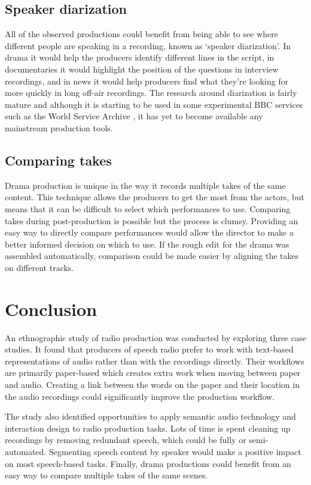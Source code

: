 \subsection{Speaker diarization}
All of the observed productions could benefit from being able to see where different people are speaking in a
recording, known as `speaker diarization'. In drama it would help the producers identify different lines in the script,
in documentaries it would highlight the position of the questions in interview recordings, and in news it would help
producers find what they're looking for more quickly in long off-air recordings. The research around diarization is
fairly mature \citep{AngueraMiro2012} and although it is starting to be used in some experimental BBC services such as
the World Service Archive \citep{Raimond2014}, it has yet to become available any mainstream production tools.

\subsection{Comparing takes}
Drama production is unique in the way it records multiple takes of the same content. This technique allows the
producers to get the most from the actors, but means that it can be difficult to select which performances to use.
Comparing takes during post-production is possible but the process is clumsy.  Providing an easy way to directly
compare performances would allow the director to make a better informed decision on which to use. If the rough edit for
the drama was assembled automatically, comparison could be made easier by aligning the takes on different tracks.

\section{Conclusion}\label{sec:ethno-conclusion}
An ethnographic study of radio production was conducted by exploring three case studies. It found that producers of
speech radio prefer to work with text-based representations of audio rather than with the recordings directly. Their
workflows are primarily paper-based which creates extra work when moving between paper and audio. Creating a link
between the words on the paper and their location in the audio recordings could significantly improve the production
workflow.

The study also identified opportunities to apply semantic audio technology and interaction design to radio production
tasks. Lots of time is spent cleaning up recordings by removing redundant speech, which could be fully or
semi-automated. Segmenting speech content by speaker would make a positive impact on most speech-based tasks. Finally,
drama productions could benefit from an easy way to compare multiple takes of the same scenes.
